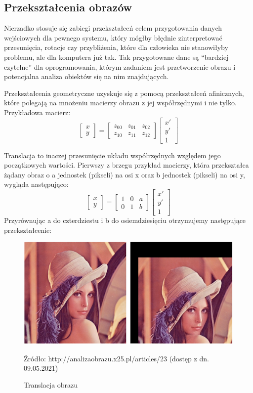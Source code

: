 \documentclass{article}
\begin{document}
	\subsection{Przekształcenia obrazów}
	\par
	Nierzadko stosuje się zabiegi przekształceń celem przygotowania danych wejściowych dla pewnego systemu, który mógłby błędnie zinterpretować przesunięcia, rotacje czy przybliżenia, które dla człowieka nie stanowiłyby problemu, ale dla komputera już tak. Tak przygotowane dane są “bardziej czytelne” dla oprogramowania, którym zadaniem jest przetworzenie obrazu i potencjalna analiza obiektów się na nim znajdujących.
	\par
	Przekształcenia geometryczne uzyskuje się z pomocą przekształceń afinicznych, które polegają na mnożeniu macierzy obrazu z jej współrzędnymi i nie tylko. Przykładowa macierz:
	\[
	\begin{bmatrix}
		x\\
		y
	\end{bmatrix}
	=
	\begin{bmatrix}
		z_{00} & z_{01} & z_{02}\\
		z_{10} & z_{11} & z_{12}
	\end{bmatrix}
	\begin{bmatrix}
		x'\\
		y'\\
		1
	\end{bmatrix}
	\]
	\par
	Translacja to inaczej przesunięcie układu współrzędnych względem jego \linebreak początkowych wartości. Pierwszy z brzegu przykład macierzy, która przekształca żądany obraz o a jednostek (pikseli) na osi x oraz b jednostek (pikseli) na osi y, wygląda następująco:
	\[
	\begin{bmatrix}
		x\\
		y
	\end{bmatrix}
	=
	\begin{bmatrix}
		1 & 0 & a\\
		0 & 1 & b
	\end{bmatrix}
	\begin{bmatrix}
		x'\\
		y'\\
		1
	\end{bmatrix}
	\]
	Przyrównując a do czterdziestu i b do osiemdziesięciu otrzymujemy następujące przekształcenie:
	\begin{figure}
		\centering
		\includegraphics[width=15cm]{translation}
		\caption{Translacja obrazu}
		Źródło: http://analizaobrazu.x25.pl/articles/23 (dostęp z dn. 09.05.2021)
	\end{figure}
\end{document}
